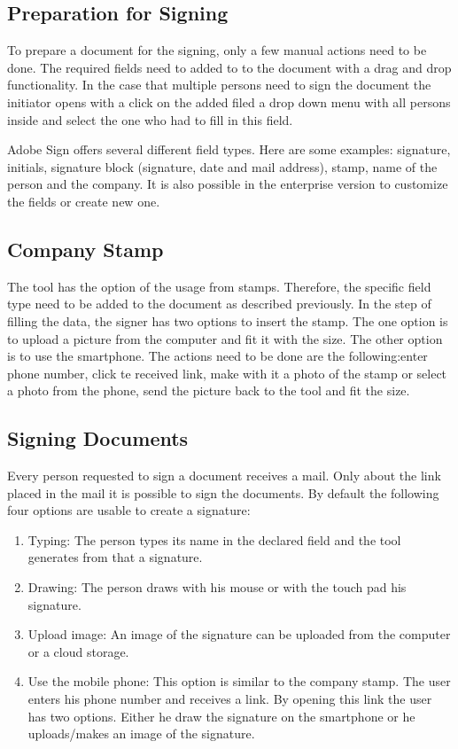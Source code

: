 \subsection{Preparation for Signing}
To prepare a document for the signing, only a few manual actions need to be done. The required fields need to added to to the document with a drag and drop functionality. In the case that multiple persons need to sign the document the initiator opens with a click on the added filed a drop down menu with all persons inside and select the one who had to fill in this field.

Adobe Sign offers several different field types. Here are some examples: signature, initials, signature block (signature, date and mail address), stamp, name of the person and the company. It is also possible in the enterprise version to customize the fields or create new one.

\subsection{Company Stamp}
The tool has the option of the usage from stamps. Therefore, the specific field type need to be added to the document as described previously. In the step of filling the data, the signer has two options to insert the stamp. The one option is to upload a picture from the computer and fit it with the size. The other option is to use the smartphone. The actions need to be done are the following:enter phone number, click te received link, make with it a photo of the stamp or select a photo from the phone, send the picture back to the tool and fit the size.

\subsection{Signing Documents}
Every person requested to sign a document receives a mail. Only about the link placed in the mail it is possible to sign the documents. By default the following four options are usable to create a signature:
\begin{enumerate}
	\item Typing: The person types its name in the declared field and the tool generates from that a signature.
	\item Drawing: The person draws with his mouse or with the touch pad his signature.  
	\item Upload image: An image of the signature can be uploaded from the computer or a cloud storage.
	\item Use the mobile phone: This option is similar to the company stamp. The user enters his phone number and receives a link. By opening this link the user has two options. Either he draw the signature on the smartphone or he uploads/makes an image of the signature.
\end{enumerate}

